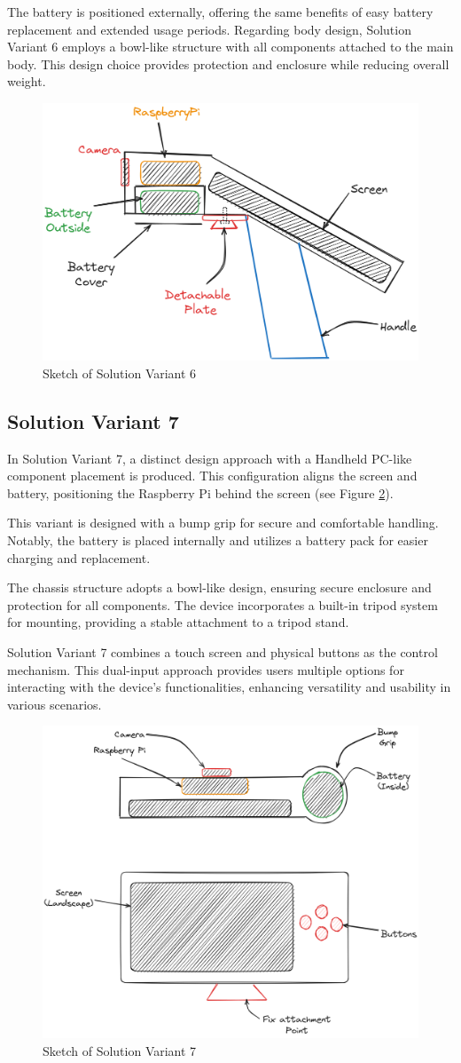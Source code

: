 The battery is positioned externally, offering the same benefits of easy battery replacement and extended usage periods. Regarding body design, Solution Variant 6 employs a bowl-like structure with all components attached to the main body. This design choice provides protection and enclosure while reducing overall weight.

\begin{figure}[H]
    \centering
    \includegraphics[width=0.5\linewidth]{texs/Part1/chapter3/image/v6.png}
    \caption{Sketch of Solution Variant 6}
    \label{fig:sketch-solution-variant-6}
\end{figure}

\subsection{Solution Variant 7}
In Solution Variant 7, a distinct design approach with a Handheld PC-like component placement is produced. This configuration aligns the screen and battery, positioning the Raspberry Pi behind the screen (see Figure \ref{fig:sketch-solution-variant-7}).

This variant is designed with a bump grip for secure and comfortable handling. Notably, the battery is placed internally and utilizes a battery pack for easier charging and replacement.

The chassis structure adopts a bowl-like design, ensuring secure enclosure and protection for all components. The device incorporates a built-in tripod system for mounting, providing a stable attachment to a tripod stand.

Solution Variant 7 combines a touch screen and physical buttons as the control mechanism. This dual-input approach provides users multiple options for interacting with the device's functionalities, enhancing versatility and usability in various scenarios.

\begin{figure}[H]
    \centering
    \includegraphics[width=0.5\linewidth]{texs/Part1/chapter3/image/v7.png}
    \caption{Sketch of Solution Variant 7}
    \label{fig:sketch-solution-variant-7}
\end{figure}

